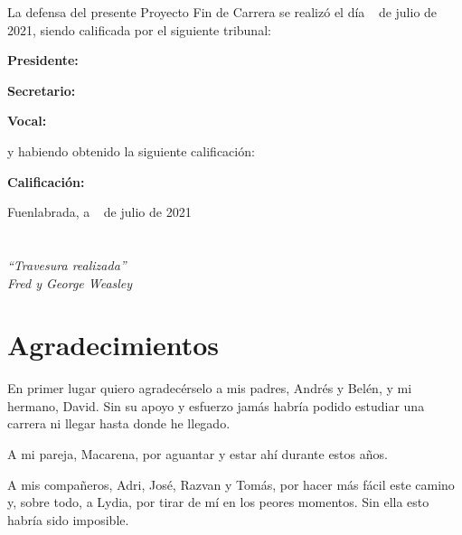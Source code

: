 \documentclass[a4paper, 12pt]{book}
\begin{document}
\vspace{1cm}
La defensa del presente Proyecto Fin de Carrera se realizó el día \qquad$\;\,$ de julio de 2021, siendo calificada por el siguiente tribunal:


\vspace{0.5cm}
\textbf{Presidente:}

\vspace{1.2cm}
\textbf{Secretario:}

\vspace{1.2cm}
\textbf{Vocal:}


\vspace{1.2cm}
y habiendo obtenido la siguiente calificación:

\vspace{1cm}
\textbf{Calificación:}


\vspace{1cm}
\begin{flushright}
Fuenlabrada, a \qquad$\;\,$ de julio de 2021
\end{flushright}


\chapter*{}
\begin{flushright}
\textit{``Travesura realizada''\\
Fred y George Weasley}
\end{flushright}


\chapter*{Agradecimientos}
En primer lugar quiero agradecérselo a mis padres, Andrés y Belén, y mi hermano, David.
Sin su apoyo y esfuerzo jamás habría podido estudiar una carrera ni llegar hasta donde he llegado.

A mi pareja, Macarena, por aguantar y estar ahí durante estos años.

A mis compañeros, Adri, José, Razvan y Tomás, por hacer más fácil este camino y, sobre todo, a Lydia, por tirar de mí en los peores momentos.
Sin ella esto habría sido imposible.
\end{document}
